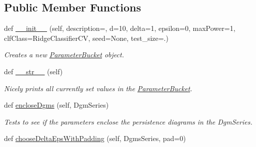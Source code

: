 \subsection*{Public Member Functions}
\begin{DoxyCompactItemize}
\item 
def \hyperlink{classteaspoon_1_1_m_l_1_1tents_1_1_parameter_bucket_a3134297e20272c91ac6ab54a92efb6e5}{\+\_\+\+\_\+init\+\_\+\+\_\+} (self, description=\textquotesingle{}\textquotesingle{}, d=10, delta=1, epsilon=0, max\+Power=1, clf\+Class=Ridge\+Classifier\+CV, seed=None, test\+\_\+size=.)
\begin{DoxyCompactList}\small\item\em Creates a new \hyperlink{classteaspoon_1_1_m_l_1_1tents_1_1_parameter_bucket}{Parameter\+Bucket} object. \end{DoxyCompactList}\item 
def \hyperlink{classteaspoon_1_1_m_l_1_1tents_1_1_parameter_bucket_a39e9d1148208dce4a8dec9354afb789d}{\+\_\+\+\_\+str\+\_\+\+\_\+} (self)\hypertarget{classteaspoon_1_1_m_l_1_1tents_1_1_parameter_bucket_a39e9d1148208dce4a8dec9354afb789d}{}\label{classteaspoon_1_1_m_l_1_1tents_1_1_parameter_bucket_a39e9d1148208dce4a8dec9354afb789d}

\begin{DoxyCompactList}\small\item\em Nicely prints all currently set values in the \hyperlink{classteaspoon_1_1_m_l_1_1tents_1_1_parameter_bucket}{Parameter\+Bucket}. \end{DoxyCompactList}\item 
def \hyperlink{classteaspoon_1_1_m_l_1_1tents_1_1_parameter_bucket_afbc1ce46c67e2a86a72d93cdcba558ea}{enclose\+Dgms} (self, Dgm\+Series)
\begin{DoxyCompactList}\small\item\em Tests to see if the parameters enclose the persistence diagrams in the Dgm\+Series. \end{DoxyCompactList}\item 
def \hyperlink{classteaspoon_1_1_m_l_1_1tents_1_1_parameter_bucket_a4dd95135123384b08f2e8fccd11e7d27}{choose\+Delta\+Eps\+With\+Padding} (self, Dgms\+Series, pad=0)
\end{DoxyCompactItemize}
